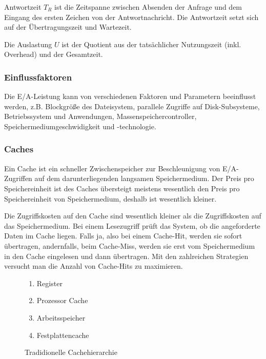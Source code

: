 \begin{term}[Antwortzeit]
	Antwortzeit $T_R$ ist die Zeitspanne zwischen Absenden der Anfrage und dem Eingang des ersten Zeichen von der Antwortnachricht. Die Antwortzeit setzt sich auf der Übertragungszeit und Wartezeit.
\end{term}

\begin{term}[Auslastung]
	Die Auslastung $U$ ist der Quotient aus der tatsächlicher Nutzungszeit (inkl. Overhead) und der Gesamtzeit. 
\end{term}


\subsubsection{Einflussfaktoren}
Die E/A-Leistung kann von verschiedenen Faktoren und Parametern beeinflusst werden, z.B. Blockgröße des Dateisystem, parallele Zugriffe auf Disk-Subsysteme, Betriebssystem und Anwendungen, Massenspeichercontroller, Speichermediumgeschwidigkeit und -technologie.



\subsubsection{Caches}
Ein Cache ist ein schneller Zwischenspeicher zur Beschleunigung von E/A-Zugriffen auf dem darunterliegenden langsamen Speichermedium. 
Der Preis pro Speichereinheit ist des Caches übersteigt meistens wesentlich den Preis pro Speichereinheit von Speichermedium, deshalb ist wesentlich kleiner.

Die Zugriffskosten auf den Cache sind wesentlich kleiner als die Zugriffskosten auf das Speichermedium. 
Bei einem Lesezugriff prüft das System, ob die angeforderte Daten im Cache liegen. 
Falls ja, also bei einem Cache-Hit, werden sie sofort übertragen, andernfalls, beim Cache-Miss, werden sie erst vom Speichermedium in den Cache eingelesen und dann übertragen. 
Mit den zahlreichen Strategien versucht man die Anzahl von Cache-Hits zu maximieren.  

\begin{figure}[h]
	\centering
	\begin{minipage}[t]{0.3\textwidth}
		\begin{enumerate}
			\item Register
			\item Prozessor Cache
			\item Arbeitsspeicher
			\item Festplattencache
		\end{enumerate}
	\end{minipage}
	\caption{Tradidionelle Cachehierarchie}
\end{figure}

